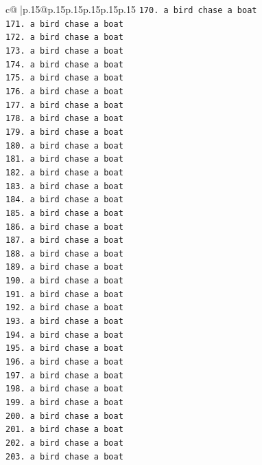\documentclass{article}
\begin{document}
{\begin{supertabular}{c@{$\;$}|p{.15\linewidth}@{}p{.15\linewidth}p{.15\linewidth}p{.15\linewidth}p{.15\linewidth}p{.15\linewidth}}
{{{\texttt{170. a bird chase a boat} \\
\texttt{171. a bird chase a boat} \\
\texttt{172. a bird chase a boat} \\
\texttt{173. a bird chase a boat} \\
\texttt{174. a bird chase a boat} \\
\texttt{175. a bird chase a boat} \\
\texttt{176. a bird chase a boat} \\
\texttt{177. a bird chase a boat} \\
\texttt{178. a bird chase a boat} \\
\texttt{179. a bird chase a boat} \\
\texttt{180. a bird chase a boat} \\
\texttt{181. a bird chase a boat} \\
\texttt{182. a bird chase a boat} \\
\texttt{183. a bird chase a boat} \\
\texttt{184. a bird chase a boat} \\
\texttt{185. a bird chase a boat} \\
\texttt{186. a bird chase a boat} \\
\texttt{187. a bird chase a boat} \\
\texttt{188. a bird chase a boat} \\
\texttt{189. a bird chase a boat} \\
\texttt{190. a bird chase a boat} \\
\texttt{191. a bird chase a boat} \\
\texttt{192. a bird chase a boat} \\
\texttt{193. a bird chase a boat} \\
\texttt{194. a bird chase a boat} \\
\texttt{195. a bird chase a boat} \\
\texttt{196. a bird chase a boat} \\
\texttt{197. a bird chase a boat} \\
\texttt{198. a bird chase a boat} \\
\texttt{199. a bird chase a boat} \\
\texttt{200. a bird chase a boat} \\
\texttt{201. a bird chase a boat} \\
\texttt{202. a bird chase a boat} \\
\texttt{203. a bird chase a boat} \\
}}}
\end{supertabular}}
\end{document}
